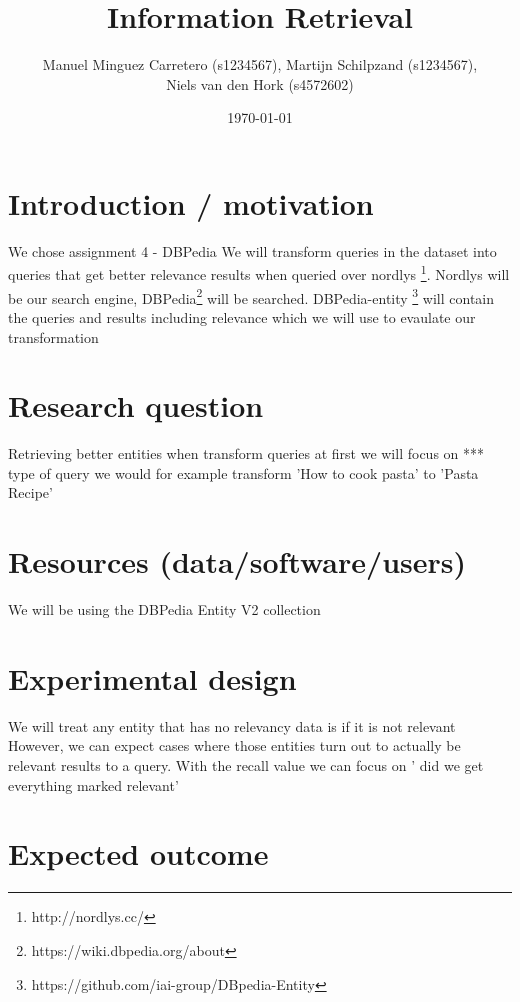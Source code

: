 \documentclass[12pt]{article}
\newcommand{\sect}[1]{\section{#1} \label{#1} }
\begin{document}
\title{Information Retrieval}
\author{
Manuel Minguez Carretero (s1234567), Martijn Schilpzand (s1234567),\\ Niels van den Hork (s4572602)}
\date{\today}


\maketitle



\sect{    Introduction / motivation}
We chose assignment 4 - DBPedia
We will transform queries in the dataset into queries that get better relevance results  when queried over nordlys \footnote{http://nordlys.cc/}. Nordlys will be our search engine, DBPedia\footnote{https://wiki.dbpedia.org/about} will be searched. DBPedia-entity \footnote{https://github.com/iai-group/DBpedia-Entity} will contain the queries and results including relevance which we will use to evaulate our transformation 

\sect{    Research question}
Retrieving better entities when transform queries 
at first we will focus on *** type of query
we would for example transform 'How to cook pasta' to 'Pasta Recipe'


\sect{    Resources (data/software/users)}
We will be using the DBPedia Entity V2 collection

\sect{    Experimental design}


We will treat any entity that has no relevancy data is if it is not relevant
However, we can expect cases where those entities turn out to actually be relevant results to a query. With the recall value we can focus on ' did we get everything marked relevant'  

\sect{    Expected outcome}
\end{document}
